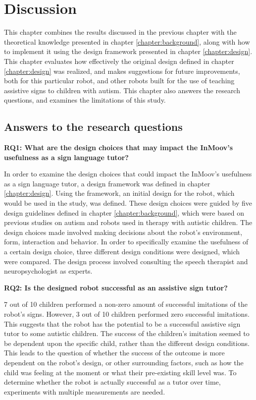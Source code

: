 \chapter{Discussion}
\label{chapter:discussion}

This chapter combines the results discussed in the previous chapter with the theoretical knowledge presented in chapter \ref{chapter:background}, along with how to implement it using the design framework presented in chapter \ref{chapter:design}. This chapter evaluates how effectively the original design defined in chapter \ref{chapter:design} was realized, and makes suggestions for future improvements, both for this particular robot, and other robots built for the use of teaching assistive signs to children with autism. This chapter also answers the research questions, and examines the limitations of this study.


\section{Answers to the research questions}

\vspace{3mm}
\noindent\textbf{RQ1: What are the design choices that may impact the InMoov's usefulness as a sign language tutor?}
\vspace{1mm}

In order to examine the design choices that could impact the InMoov's usefulness as a sign language tutor, a design framework was defined in chapter \ref{chapter:design}. Using the framework, an initial design for the robot, which would be used in the study, was defined. These design choices were guided by five design guidelines defined in chapter \ref{chapter:background}, which were based on previous studies on autism and robots used in therapy with autistic children. The design choices made involved making decisions about the robot's environment, form, interaction and behavior. In order to specifically examine the usefulness of a certain design choice, three different design conditions were designed, which were compared. The design process involved consulting the speech therapist and neuropsychologist as experts.

\vspace{3mm}
\noindent\textbf{RQ2: Is the designed robot successful as an assistive sign tutor?}
\vspace{1mm}

7 out of 10 children performed a non-zero amount of successful imitations of the robot's signs. However, 3 out of 10 children performed zero successful imitations. This suggests that the robot has the potential to be a successful assistive sign tutor to some autistic children. The success of the children's imitation seemed to be dependent upon the specific child, rather than the different design conditions. This leads to the question of whether the success of the outcome is more dependent on the robot's design, or other surrounding factors, such as how the child was feeling at the moment or what their pre-existing skill level was. To determine whether the robot is actually successful as a tutor over time, experiments with multiple measurements are needed.

